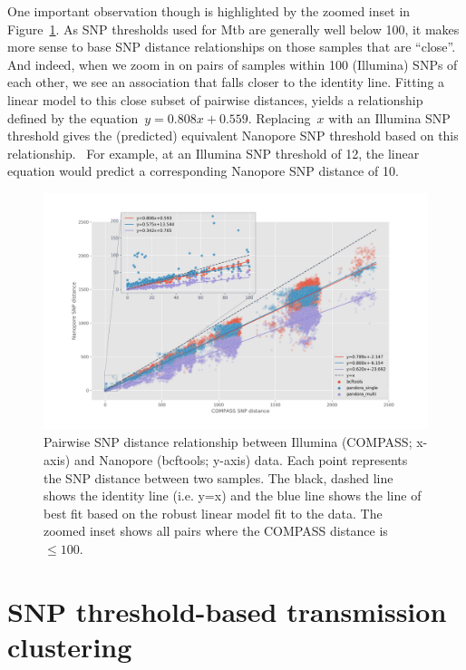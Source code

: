 One important observation though is highlighted by the zoomed inset in
Figure~{\ref{638875}}. As SNP thresholds used for Mtb
are generally well below 100, it makes more sense to base SNP distance
relationships on those samples that are ``close''. And indeed, when we
zoom in on pairs of samples within 100 (Illumina) SNPs of each other, we
see an association that falls closer to the identity line. Fitting a
linear model to this close subset of pairwise distances, yields a
relationship defined by the equation~\(y=0.808x+0.559\).
Replacing~\(x\) with an Illumina SNP threshold gives the
(predicted) equivalent Nanopore SNP threshold based on this
relationship.~ For example, at an Illumina SNP threshold of 12, the
linear equation would predict a corresponding Nanopore SNP distance of
10.~



\begin{figure}
\begin{center}
\includegraphics[width=0.70\columnwidth]{Chapter2/Figs/combined-dotplots.png}
\caption{{Pairwise SNP distance relationship between Illumina (COMPASS; x-axis)
and Nanopore (bcftools; y-axis) data. Each point represents the SNP
distance between two samples. The black, dashed line shows the identity
line (i.e. y=x) and the blue line shows the line of best fit based on
the robust linear model fit to the data. The zoomed inset shows all
pairs where the COMPASS distance is~\(\le100\).
{\label{638875}}%
}}
\end{center}
\end{figure}




\section{SNP threshold-based \ont{} transmission clustering}

